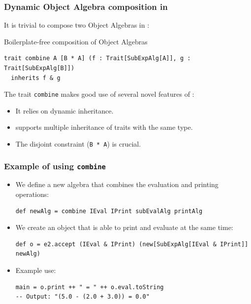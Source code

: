 \documentclass{beamer}
\begin{document}
\begin{frame}[fragile]
  \frametitle{Dynamic Object Algebra composition in \name}

  It is trivial to compose two Object Algebras in \name:

  \begin{exampleblock}{Boilerplate-free composition of Object Algebras}
\begin{lstlisting}
trait combine A [B * A] (f : Trait[SubExpAlg[A]], g : Trait[SubExpAlg[B]])
  inherits f & g
\end{lstlisting}
  \end{exampleblock}

  \pause

  The trait \lstinline{combine} makes good use of several novel features of \name:

  \begin{block}{}
    \begin{itemize}
    \item It relies on dynamic inheritance.
    \item \name supports multiple inheritance of traits with the same type.
    \item The disjoint constraint (\lstinline{B * A}) is crucial.
    \end{itemize}
  \end{block}
\end{frame}


\begin{frame}[fragile]
  \frametitle{Example of using \lstinline{combine}}

  \begin{itemize}[<+->]
  \item   We define a new algebra that combines the evaluation and printing operations:
\begin{lstlisting}
def newAlg = combine IEval IPrint subEvalAlg printAlg
\end{lstlisting}
  \item We create an object that is able to print and evaluate at the same time:
\begin{lstlisting}
def o = e2.accept (IEval & IPrint) (new[SubExpAlg[IEval & IPrint]] newAlg)
\end{lstlisting}
  \item Example use:
\begin{lstlisting}
main = o.print ++ " = " ++ o.eval.toString
-- Output: "(5.0 - (2.0 + 3.0)) = 0.0"
\end{lstlisting}


  \end{itemize}



\end{frame}
\end{document}
